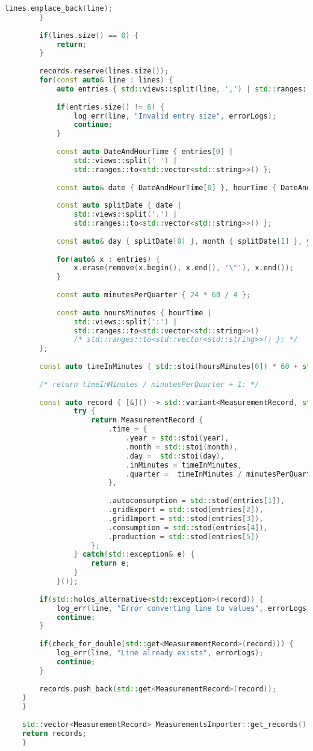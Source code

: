 \begin{lstlisting}[caption=Zawartość pliku \texttt{MeasurementsImporter.cpp}, label={lst:msimportercpp}, language=C++]
			lines.emplace_back(line);
		}
		
		if(lines.size() == 0) {
			return;
		}
		
		records.reserve(lines.size());
		for(const auto& line : lines) {
			auto entries { std::views::split(line, ',') | std::ranges::to<std::vector<std::string>>() };
			
			if(entries.size() != 6) {
				log_err(line, "Invalid entry size", errorLogs);
				continue;
			}
			
			const auto DateAndHourTime { entries[0] |
				std::views::split(' ') |
				std::ranges::to<std::vector<std::string>>() };
			
			const auto& date { DateAndHourTime[0] }, hourTime { DateAndHourTime[1] };
			
			const auto splitDate { date |
				std::views::split('.') |
				std::ranges::to<std::vector<std::string>>() };
			
			const auto& day { splitDate[0] }, month { splitDate[1] }, year { splitDate[2] };
			
			for(auto& x : entries) {
				x.erase(remove(x.begin(), x.end(), '\"'), x.end());
			}
			
			const auto minutesPerQuarter { 24 * 60 / 4 };
			
			const auto hoursMinutes { hourTime |
				std::views::split(':') |
				std::ranges::to<std::vector<std::string>>()
				/* std::ranges::to<std::vector<std::string>>() }; */
		};
		
		const auto timeInMinutes { std::stoi(hoursMinutes[0]) * 60 + std::stoi(hoursMinutes[1]) };
		
		/* return timeInMinutes / minutesPerQuarter + 1; */
		
		const auto record { [&]() -> std::variant<MeasurementRecord, std::exception> const {
				try {
					return MeasurementRecord {
						.time = {
							.year = std::stoi(year),
							.month = std::stoi(month),
							.day =  std::stoi(day),
							.inMinutes = timeInMinutes,
							.quarter = 	timeInMinutes / minutesPerQuarter + 1				
						},
						
						.autoconsumption = std::stod(entries[1]),
						.gridExport = std::stod(entries[2]),
						.gridImport = std::stod(entries[3]),
						.consumption = std::stod(entries[4]),
						.production = std::stod(entries[5])
					};
				} catch(std::exception& e) {
					return e;
				}
			}()};
		
		if(std::holds_alternative<std::exception>(record)) {
			log_err(line, "Error converting line to values", errorLogs);
			continue;
		}
		
		if(check_for_double(std::get<MeasurementRecord>(record))) {
			log_err(line, "Line already exists", errorLogs);
			continue;
		}
		
		records.push_back(std::get<MeasurementRecord>(record));
	}
	}
	
	std::vector<MeasurementRecord> MeasurementsImporter::get_records() const {
	return records;
	}
\end{lstlisting}

